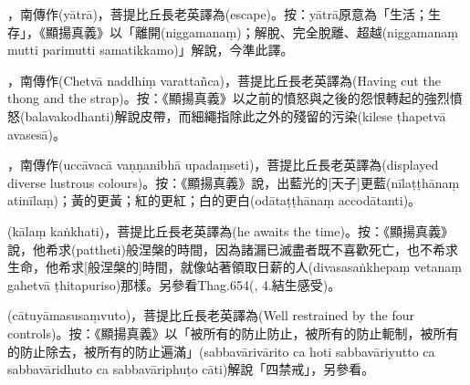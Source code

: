 \startitemgroup[noteitems]
\item{}，南傳作(yātrā)，菩提比丘長老英譯為(escape)。按：yātrā原意為「生活；生存」，《顯揚真義》以「離開(niggamanaṃ)；解脫、完全脫離、超越(niggamanaṃ mutti parimutti samatikkamo)」解說，今準此譯。
\stopitemgroup

\startitemgroup[noteitems]
\item{}，南傳作(Chetvā naddhiṃ varattañca)，菩提比丘長老英譯為(Having cut the thong and the strap)。按：《顯揚真義》以之前的憤怒與之後的怨恨轉起的強烈憤怒(balavakodhanti)解說皮帶，而細繩指除此之外的殘留的污染(kilese ṭhapetvā avasesā)。
\stopitemgroup

\startitemgroup[noteitems]
\item{}，南傳作(uccāvacā vaṇṇanibhā upadaṃseti)，菩提比丘長老英譯為(displayed diverse lustrous colours)。按：《顯揚真義》說，出藍光的[天子]更藍(nīlaṭṭhānaṃ atinīlaṃ)；黃的更黃；紅的更紅；白的更白(odātaṭṭhānaṃ accodātanti)。
\stopitemgroup

\startitemgroup[noteitems]
\item{}(kālaṃ kaṅkhati)，菩提比丘長老英譯為(he awaits the time)。按：《顯揚真義》說，他希求(pattheti)般涅槃的時間，因為諸漏已滅盡者既不喜歡死亡，也不希求生命，他希求[般涅槃的]時間，就像站著領取日薪的人(divasasaṅkhepaṃ vetanaṃ gahetvā ṭhitapuriso)那樣。另參看Thag.654(, 4.結生感受)。
\stopitemgroup

\startitemgroup[noteitems]
\item{}(cātuyāmasusaṃvuto)，菩提比丘長老英譯為(Well restrained by the four controls)。按：《顯揚真義》以「被所有的防止防止，被所有的防止軛制，被所有的防止除去，被所有的防止遍滿」(sabbavārivārito ca hoti sabbavāriyutto ca sabbavāridhuto ca sabbavāriphuṭo cāti)解說「四禁戒」，另參看。
\stopitemgroup

